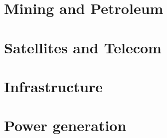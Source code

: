 \documentclass[a4paper,11pt]{article}
\begin{document}
\titleTMB 
\newpage
\tableofcontents
\newpage

\section{ Mining and Petroleum}
\section{Satellites and Telecom}
\section{Infrastructure}
\section{Power generation}
\end{document}
